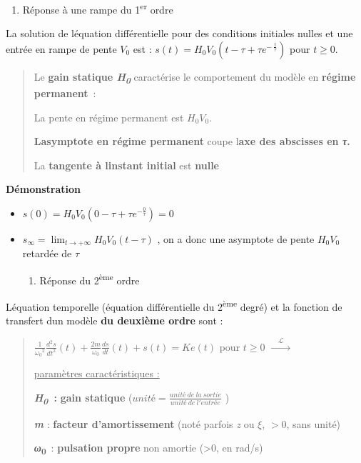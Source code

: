 \begin{enumerate}
\def\labelenumi{\arabic{enumi}.}
\item
  \protect\hypertarget{_Toc99121102}{}{}Réponse à une rampe du 1\textsuperscript{er} ordre
\end{enumerate}

La solution de l\textquotesingle équation différentielle pour des conditions initiales nulles et une entrée en rampe de pente \(V_{0}\) est : \(s(t) = H_{0}V_{0}\left( t - \tau + \tau e^{- \ \frac{t}{\tau}} \right)\) pour \(t \geq 0\).

\begin{quote}
Le \textbf{gain statique \emph{H\textsubscript{0}}} caractérise le comportement du modèle en \textbf{régime permanent}~:

La pente en régime permanent est \(H_{0}V_{0}\).

\textbf{L\textquotesingle asymptote en régime permanent} coupe l\textquotesingle{}\textbf{axe des abscisses en \emph{τ}.}

La \textbf{tangente à l\textquotesingle instant initial} est \textbf{nulle}
\end{quote}

\textbf{Démonstration}

\begin{itemize}
\item
  \(s(0) = H_{0}V_{0}\left( 0 - \tau + \tau e^{- \frac{0}{\tau}} \right) = 0\)
\item
  \(s_{\infty} = \lim_{t \rightarrow + \infty}{H_{0}V_{0}(t - \tau)}\) , on a donc une asymptote de pente \(H_{0}V_{0}\) retardée de \(\tau\)

  \begin{enumerate}
  \def\labelenumi{\arabic{enumi}.}
  \item
    \protect\hypertarget{_Toc99121103}{}{}Réponse du 2\textsuperscript{ème} ordre
  \end{enumerate}
\end{itemize}

L\textquotesingle équation temporelle (équation différentielle du 2\textsuperscript{ème} degré) et la fonction de transfert d\textquotesingle un modèle \textbf{du deuxième ordre} sont :

\begin{quote}
\(\frac{1}{{\omega_{0}}^{2}}\frac{d^{2}s}{{dt}^{2}}(t) + \frac{2m}{\omega_{0}}\frac{ds}{dt}(t) + s(t) = Ke(t)\) pour \(t \geq 0\) \(\overset{\quad\mathcal{L}\quad}{\rightarrow}\)

\ul{paramètres caractéristiques :}

\textbf{\emph{H\textsubscript{0}~}:} \textbf{gain statique} (\(unité = \frac{unité\ de\ la\ sortie}{unité\ de\ l'entrée}\) )

\emph{\textbf{m}} : \textbf{facteur d'amortissement} (noté parfois \emph{z} ou \(\xi\), \(> 0\), sans unité)

\textbf{\emph{ω}\textsubscript{0}}~: \textbf{pulsation propre} non amortie (\textgreater0, en rad/s)
\end{quote}

